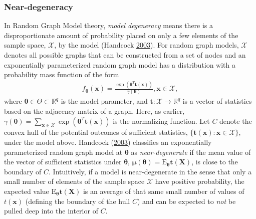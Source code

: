 \documentclass[]{article}
\theoremstyle{definition}
\begin{document}
\hypertarget{near-degeneracy}{%
\subsubsection{Near-degeneracy}\label{near-degeneracy}}

In Random Graph Model theory, \emph{model degeneracy} means there is a
disproportionate amount of probability placed on only a few elements of
the sample space, \(\mathcal{X}\), by the model (Handcock
\protect\hyperlink{ref-handcock2003assessing}{2003}). For random graph
models, \(\mathcal{X}\) denotes all possible graphs that can be
constructed from a set of nodes and an exponentially parameterized
random graph model has a distribution with a probability mass function
of the form \begin{align*}
f_{\boldsymbol \theta} (\boldsymbol x) = \frac{\exp\left(\boldsymbol \theta^T \boldsymbol t(\boldsymbol x)\right)}{\gamma(\boldsymbol \theta)}, \boldsymbol x \in \mathcal{X},
\end{align*} where
\(\boldsymbol \theta \in \Theta \subset \mathbb{R}^q\) is the model
parameter, and \(\boldsymbol t: \mathcal{X} \rightarrow \mathbb{R}^q\)
is a vector of statistics based on the adjacency matrix of a graph.
Here, as earlier,
\(\gamma(\boldsymbol \theta) = \sum_{\boldsymbol x \in \mathcal{X}} \exp\left(\boldsymbol \theta^T \boldsymbol t(\boldsymbol x)\right)\)
is the normalizing function. Let \(C\) denote the convex hull of the
potential outcomes of sufficient statistics,
\(\{\boldsymbol t(\boldsymbol x): \boldsymbol x \in \mathcal{X}\}\),
under the model above. Handcock
(\protect\hyperlink{ref-handcock2003assessing}{2003}) classifies an
exponentially parameterized random graph model at \(\boldsymbol \theta\)
as \emph{near-degenerate} if the mean value of the vector of sufficient
statistics under \(\boldsymbol \theta\),
\(\boldsymbol \mu(\boldsymbol \theta) = \text{E}_{\boldsymbol \theta}\boldsymbol t( \boldsymbol X)\),
is close to the boundary of \(C\). Intuitively, if a model is
near-degenerate in the sense that only a small number of elements of the
sample space \(\mathcal{X}\) have positive probability, the expected
value \(\text{E}_{\boldsymbol \theta}\boldsymbol t( \boldsymbol X)\) is
an average of that same small number of values of \(t( \boldsymbol x)\)
(defining the boundary of the hull \(C\)) and can be expected to
\emph{not} be pulled deep into the interior of \(C\).
\end{document}
